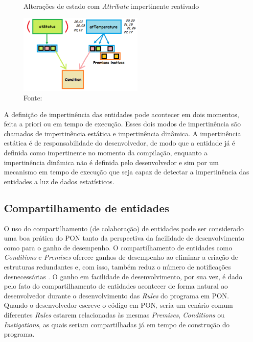 \begin{figure}[!htb]
  \centering
  \caption{Alterações de estado com \textit{Attribute} impertinente reativado}
    \includegraphics[width=0.55\textwidth]{../figures/pr_imp_3.png}
  \smallskip
  \caption*{Fonte: }
  \label{fig:pr_imp_3}
\end{figure}

\FloatBarrier

A definição de impertinência das entidades pode acontecer em dois momentos,
feita a priori ou em tempo de execução. Esses dois modos de impertinência são
chamados de impertinência estática e impertinência dinâmica. A impertinência
estática é de responsabilidade do desenvolvedor, de modo que a entidade já é
definida como impertinente no momento da compilação, enquanto a impertinência
dinâmica não é definida pelo desenvolvedor e sim por um mecanismo em tempo de
execução que seja capaz de detectar a impertinência das entidades a luz de dados
estatísticos.

\subsection{Compartilhamento de entidades}\label{sec:compartilhamento}

O uso do compartilhamento (de colaboração) de entidades pode ser considerado uma
boa prática do PON tanto da perspectiva da facilidade de desenvolvimento como
para o ganho de desempenho. O compartilhamento de entidades como
\textit{Conditions} e \textit{Premises} oferece ganhos de desempenho ao eliminar
a criação de estruturas redundantes e, com isso, também reduz o número de
notificações desnecessárias \cite{msc_Ronszcka_2012}. O ganho em facilidade de
desenvolvimento, por sua vez, é dado pelo fato do compartilhamento de entidades
acontecer de forma natural ao desenvolvedor durante o desenvolvimento das
\textit{Rules} do programa em PON. Quando o desenvolvedor escreve o código em
PON, seria um cenário comum diferentes \textit{Rules} estarem relacionadas às
mesmas \textit{Premises}, \textit{Conditions} ou \textit{Instigations}, as quais
seriam compartilhadas já em tempo de construção do programa.

